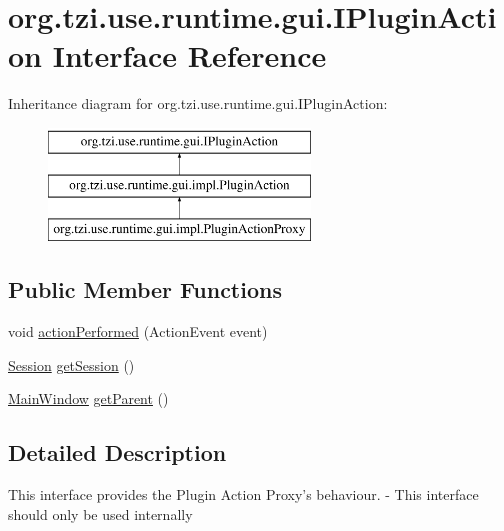 \hypertarget{interfaceorg_1_1tzi_1_1use_1_1runtime_1_1gui_1_1_i_plugin_action}{\section{org.\-tzi.\-use.\-runtime.\-gui.\-I\-Plugin\-Action Interface Reference}
\label{interfaceorg_1_1tzi_1_1use_1_1runtime_1_1gui_1_1_i_plugin_action}
}
Inheritance diagram for org.\-tzi.\-use.\-runtime.\-gui.\-I\-Plugin\-Action\-:\begin{figure}[H]
\begin{center}
\leavevmode
\includegraphics[height=3.000000cm]{interfaceorg_1_1tzi_1_1use_1_1runtime_1_1gui_1_1_i_plugin_action}
\end{center}
\end{figure}
\subsection*{Public Member Functions}
\begin{DoxyCompactItemize}
\item 
void \hyperlink{interfaceorg_1_1tzi_1_1use_1_1runtime_1_1gui_1_1_i_plugin_action_a4fa772331298649638aba695b851794c}{action\-Performed} (Action\-Event event)
\item 
\hyperlink{classorg_1_1tzi_1_1use_1_1main_1_1_session}{Session} \hyperlink{interfaceorg_1_1tzi_1_1use_1_1runtime_1_1gui_1_1_i_plugin_action_a261b058d960f5860d2430893e8964391}{get\-Session} ()
\item 
\hyperlink{classorg_1_1tzi_1_1use_1_1gui_1_1main_1_1_main_window}{Main\-Window} \hyperlink{interfaceorg_1_1tzi_1_1use_1_1runtime_1_1gui_1_1_i_plugin_action_a87256b777338ef24fd4b74fb0ed96b13}{get\-Parent} ()
\end{DoxyCompactItemize}


\subsection{Detailed Description}
This interface provides the Plugin Action Proxy's behaviour. -\/ This interface should only be used internally

